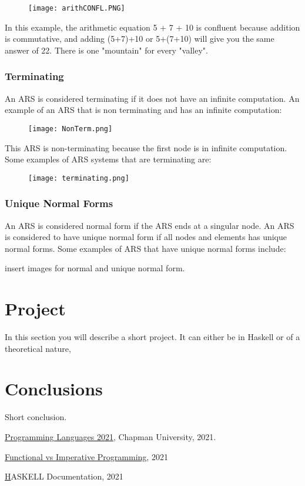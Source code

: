 \documentclass{article}
\begin{document}
\begin{figure}[H]
    \centering
    \texttt{[image: arithCONFL.PNG]}
\end{figure}
In this example, the arithmetic equation 5 + 7 + 10 is confluent because addition is commutative, and adding (5+7)+10 or 5+(7+10) will give you the same answer of 22. There is one "mountain" for every "valley".
\\
\subsubsection{Terminating}
An ARS is considered terminating if it does not have an infinite computation. An example of an ARS that is non terminating and has an infinite computation:

\begin{figure}[H]
    \centering
    \texttt{[image: NonTerm.png]}
\end{figure}

This ARS is non-terminating because the first node is in infinite computation. Some examples of ARS systems that are terminating are:
\begin{figure}[H]
    \centering
    \texttt{[image: terminating.png]}
\end{figure}

\subsubsection{Unique Normal Forms}
An ARS is considered normal form if the ARS ends at a singular node. An ARS is considered to have unique normal form if all nodes and elements has unique normal forms. Some examples of ARS that have unique normal forms include:

insert images for normal and unique normal form.



\section{Project}

In this section you will describe a short project. It can either be in Haskell or of a theoretical nature,

\section{Conclusions}\label{conclusions}
Short conclusion.

\begin{thebibliography}{99}
 \href{https://github.com/alexhkurz/programming-languages-2021/blob/main/README.md}{Programming Languages 2021}, Chapman University, 2021.

\href{https://docs.microsoft.com/en-us/dotnet/standard/linq/functional-vs-imperative-programming}{Functional vs Imperative Programming}, 2021

\href{https://www.haskell.org/} HASKELL Documentation, 2021
\end{thebibliography}
\end{document}
